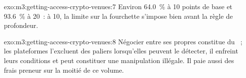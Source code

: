 \begin{solution}{exo:m3:getting-access-crypto-venues:7}
Environ 64.0~\% à 10 points de base et 93.6~\% à 20~: à 10, la limite sur la fourchette s'impose bien avant la règle de profondeur.
\end{solution}

\begin{solution}{exo:m3:getting-access-crypto-venues:8}
Négocier entre ses propres  constitue du ~; les plateformes l'excluent des paliers lorsqu'elles peuvent le détecter, il enfreint leurs conditions et peut constituer une manipulation illégale.
Il paie aussi des frais preneur sur la moitié de ce volume.
\end{solution}

